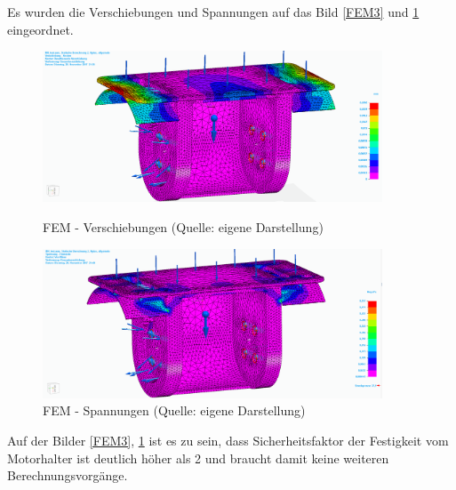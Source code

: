 Es wurden die Verschiebungen und Spannungen auf das Bild \ref{FEM3} und \ref{FEM4} eingeordnet. 

\begin{figure}[htb]
	\centering
	\begin{minipage}{0.49\linewidth}
		\centering\includegraphics[width=0.9\textwidth]{images/FEM3.png}
		\caption{FEM - Verschiebungen \newline (Quelle: eigene Darstellung)}
		\label{FEM3}
	\end{minipage}
	\begin{minipage}[h]{0.49\linewidth}
		\centering\includegraphics[width=0.9\textwidth]{images/FEM4.png}
		\caption{FEM - Spannungen \newline (Quelle: eigene Darstellung)}
		\label{FEM4}
	\end{minipage}
\end{figure}

Auf der Bilder \ref{FEM3}, \ref{FEM4} ist es zu sein, dass Sicherheitsfaktor der Festigkeit vom Motorhalter ist deutlich höher als 2 und braucht damit keine weiteren Berechnungsvorgänge.

